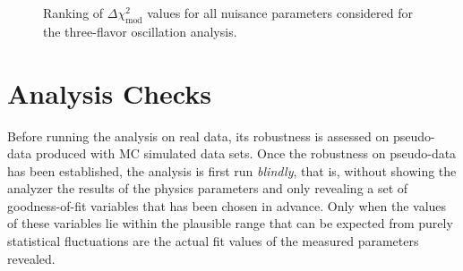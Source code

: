 \begin{figure}
    \centering
    \caption{Ranking of $\Delta \chi^2_{\mathrm{mod}}$ values for all nuisance parameters considered for the three-flavor oscillation analysis.}
    \label{fig:systematic-impact-mismod-ranking}
\end{figure}

\section{Analysis Checks}
Before running the analysis on real data, its robustness is assessed on pseudo-data produced with MC simulated data sets. Once the robustness on pseudo-data has been established, the analysis is first run \emph{blindly}, that is, without showing the analyzer the results of the physics parameters and only revealing a set of goodness-of-fit variables that has been chosen in advance. Only when the values of these variables lie within the plausible range that can be expected from purely statistical fluctuations are the actual fit values of the measured parameters revealed. 

